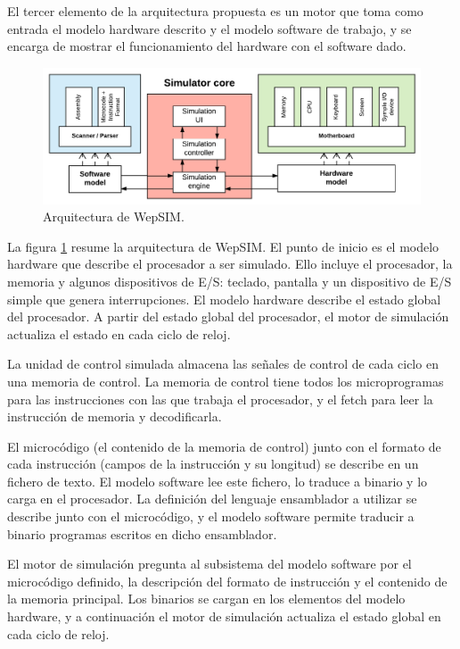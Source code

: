 El tercer elemento de la arquitectura propuesta es un motor que toma como entrada el modelo hardware descrito y el modelo software de trabajo, y se encarga de mostrar el funcionamiento del hardware con el software dado.

\begin{figure}[htbp]
 	\centering
 	\includegraphics[width=14cm]{figures/architecture_diagram}
 	\caption{Arquitectura de WepSIM.}
	\label{fig:architecture_diagram}
\end{figure}

La figura \ref{fig:architecture_diagram} resume la arquitectura de WepSIM. El punto de inicio es el modelo hardware que describe el procesador a ser simulado. Ello incluye el procesador, la memoria y algunos dispositivos de E/S: teclado, pantalla y un dispositivo de E/S simple que genera interrupciones. El modelo hardware describe el estado global del procesador. A partir del estado global del procesador, el motor de simulación actualiza el estado en cada ciclo de reloj.

La unidad de control simulada almacena las señales de control de cada ciclo en una memoria de control. La memoria de control tiene todos los microprogramas para las instrucciones con las que trabaja el procesador, y el fetch para leer la instrucción de memoria y decodificarla.


El microcódigo (el contenido de la memoria de control) junto con el formato de cada instrucción (campos de la instrucción y su longitud) se describe en un fichero de texto. El modelo software lee este fichero, lo traduce a binario y lo carga en el procesador. La definición del lenguaje ensamblador a utilizar se describe junto con el microcódigo, y el modelo software permite traducir a binario programas escritos en dicho ensamblador.


El motor de simulación pregunta al subsistema del modelo software por el microcódigo definido, la descripción del formato de instrucción y el contenido de la memoria principal. Los binarios se cargan en los elementos del modelo hardware, y a continuación el motor de simulación actualiza el estado global en cada ciclo de reloj.


